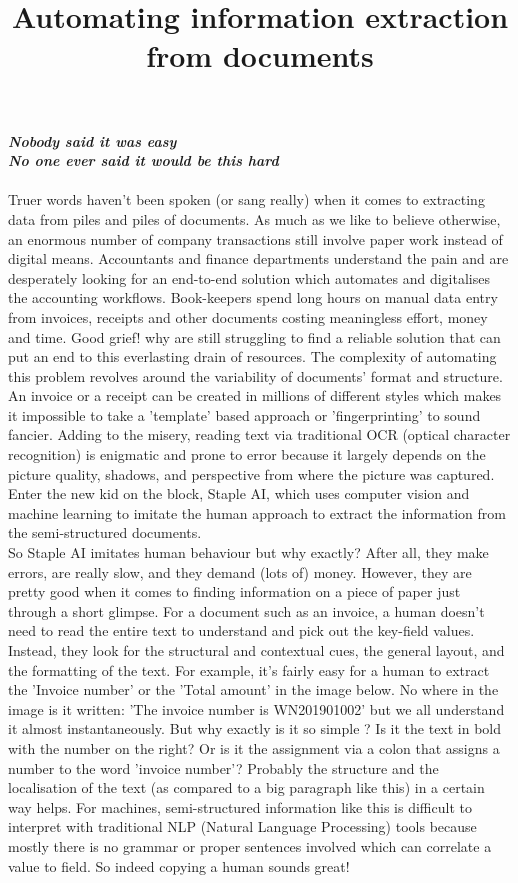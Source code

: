 \documentclass[11pt]{article}
\begin{document}
\title{Automating information extraction from documents}
\maketitle


\noindent \textbf{\textit{Nobody said it was easy \\
No one ever said it would be this hard \\ \\}
}
\noindent Truer words haven't been spoken (or sang really) when it comes to extracting data from piles and piles of documents. As much as we like to believe otherwise, an enormous number of company transactions still involve paper work instead of digital means. Accountants and finance departments understand the pain and are desperately looking for an end-to-end solution which automates and digitalises the accounting workflows.  Book-keepers spend long hours on manual data entry from invoices, receipts and other documents costing meaningless effort, money and time. Good grief! why are still struggling to find a reliable solution that can put an end to this everlasting drain of resources. The complexity of automating this problem revolves around the variability of documents' format and structure. An invoice or a receipt can be created in millions of different styles which makes it impossible to take a 'template' based approach or 'fingerprinting' to sound fancier. Adding to the misery, reading text via traditional OCR (optical character recognition) is enigmatic and prone to error because it largely depends on the picture quality, shadows, and perspective from where the picture was captured. Enter the new kid on the block, Staple AI,  which uses computer vision and machine learning to imitate the human approach to extract the information from the semi-structured documents. \\

\noindent So Staple AI imitates human behaviour but why exactly? After all, they make errors, are really slow, and they demand (lots of) money. However, they are pretty good when it comes to finding information on a piece of paper just through a short glimpse.  For a document such as an invoice, a human doesn't need to read the entire text to understand and pick out the key-field values. Instead, they look for the structural and contextual cues, the general layout, and the formatting of the text. For example, it's fairly easy for a human to extract the 'Invoice number' or the 'Total amount' in the image below. No where in the image is it written: 'The invoice number is WN201901002' but we all understand it almost instantaneously. But why exactly is it so simple ? Is it the text in bold with the number on the right? Or is it the assignment via a colon that assigns a number to the word 'invoice number'? Probably the structure and the localisation of the text (as compared to a big paragraph like this) in a certain way helps. For machines, semi-structured information like this is difficult to interpret with traditional NLP (Natural Language Processing) tools because mostly there is no grammar or proper sentences involved which can correlate a value to field. So indeed copying a human sounds great!  \\
\end{document}
